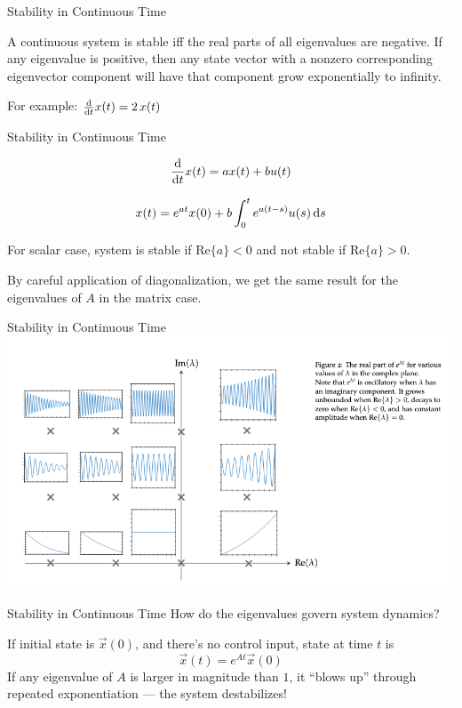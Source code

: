 \begin{frame}{Stability in Continuous Time}

A continuous system is stable iff the real parts of all eigenvalues are negative. If any eigenvalue is positive, then any state vector with a nonzero corresponding eigenvector component will have that component grow exponentially to infinity.

    For example: \(\ddt{}x(t) = 2\,x(t)\)

\end{frame}

\begin{frame}{Stability in Continuous Time}

    \[
        \ddt{} x(t) = a x(t) + b u(t)
    \]

    \[
        x(t) = e^{at} x(0) + b \int_0^t e^{a(t - s)} u(s) \,\mathrm d s
    \]

    For scalar case, system is stable if \(\mathrm{Re}\{a\} < 0\) and not stable if \(\mathrm{Re}\{a\} > 0\).

    By careful application of diagonalization, we get the same result for the eigenvalues of \(A\) in the matrix case. 

\end{frame}

\begin{frame}{Stability in Continuous Time}
    \includegraphics[width=\textwidth]{./images/cont-stability}
\end{frame}

\begin{frame}{Stability in Continuous Time}
How do the eigenvalues govern system dynamics?

    If initial state is \(\vec x(0)\), and there's no control input, state at time \(t\) is
    \[
        \vec x(t) = e^{At} \vec x(0)
    \]
    If any eigenvalue of \(A\) is larger in magnitude than \(1\), it ``blows up'' through repeated exponentiation --- the system destabilizes!
\end{frame}



